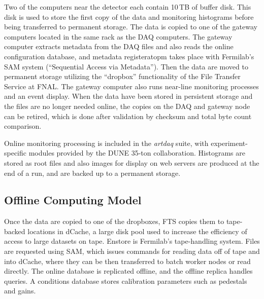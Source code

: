 Two of the computers near the detector each contain 10\,TB of buffer disk.  This disk is used to store the first copy of
the data and monitoring histograms before being transferred to permanent storage. The data is copied
to one of the gateway computers located in the same rack as the DAQ computers.  The gateway computer
extracts metadata from the DAQ files and also reads the online configuration database, and 
metadata registeratopm takes place with Fermilab's  SAM system (``Sequential Access via Metadata'').
Then the data are moved to permanent storage utilizing the ``dropbox'' functionality of the File Transfer Service at FNAL.
The gateway computer also runs near-line monitoring processes and an event display.
When the data have been stored in persistent storage and the files are no longer needed online,
the copies on the DAQ and gateway node can be retired, which is done after validation by checksum and
total byte count comparison.

Online monitoring processing is included in the {\it artdaq} suite, with experiment-specific modules
provided by the DUNE 35-ton collaboration.  Histograms are stored as root files and also
images for display on web servers are produced at the end of a run, and are backed up
to a permanent storage.


\subsection{Offline Computing Model}

Once the data are copied to one of the dropboxes, FTS copies them to tape-backed locations in dCache,
a large disk pool used to increase the efficiency of access to large datasets on tape.  Enstore is Fermilab's
tape-handling system.  Files are requested using SAM, which issues commands for reading data off of tape
and into dCache, where they can be then transferred to batch worker nodes or read directly.  
The online database is replicated offline, and the offline replica handles queries.  A conditions database
stores calibration parameters such as pedestals and gains.


